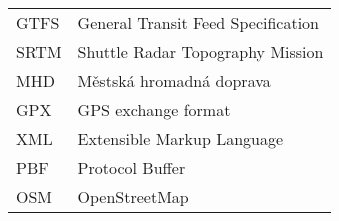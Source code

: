 \begin{tabular}{ll}
GTFS& General Transit Feed Specification\\
SRTM& Shuttle Radar Topography Mission\\
MHD& Městská hromadná doprava\\
GPX& GPS exchange format\\
XML& Extensible Markup Language\\
PBF& Protocol Buffer\\
OSM& OpenStreetMap\\
\end{tabular}

